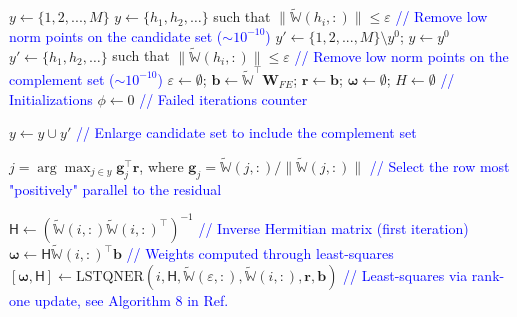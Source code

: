 \documentclass[11pt]{article}
\renewcommand{\vec}[1]{\mathbf{#1}}
\newcommand{\mat}[1]{\mathsf{#1}}
\begin{document}
            \begin{algorithm}[H]
                \begin{algorithmic} [1]%
                        \STATE $y\leftarrow \{1, 2, ..., M\}$
                        \STATE $y\leftarrow \{h_1, h_2, \dots\}$ such that $\| \widetilde{\mathbb{W}}(h_i, :) \| \leq \varepsilon$ \textcolor{blue}{// Remove low norm points on the candidate set ($\sim 10^{-10}$)}
                    \ELSE
                        \STATE $y' \leftarrow \{1, 2, ..., M\} \setminus y^0$; \quad $y\leftarrow y^0$
                        \STATE $y' \leftarrow \{h_1, h_2, \dots\}$ such that $\| \widetilde{\mathbb{W}}(h_i, :) \| \leq \varepsilon$ \textcolor{blue}{// Remove low norm points on the complement set ($\sim 10^{-10}$)}
                    \ENDIF
                    \STATE $\varepsilon \leftarrow \emptyset$; $\vec{b} \leftarrow \widetilde{\mathbb{W}}^\top \vec{W}_{FE}$; $\vec{r} \leftarrow \vec{b}$; $\boldsymbol\omega \leftarrow \emptyset$; $H \leftarrow \emptyset$ \textcolor{blue}{// Initializations}
                    \STATE $\phi \leftarrow 0$ \textcolor{blue}{// Failed iterations counter}

                        \IF{$\phi > \lambda$}
                            \STATE $y\leftarrow y \cup y'$ \textcolor{blue}{// Enlarge candidate set to include the complement set}
                        \ENDIF

                        \STATE $j = \arg\max_{j \in y} \vec{g}_j^\top \vec{r}$, where $\vec{g}_j = \widetilde{\mathbb{W}}(j, :) / \| \widetilde{\mathbb{W}}(j, :) \|$ \textcolor{blue}{// Select the row most "positively" parallel to the residual}

                            \STATE $\mat{H}\leftarrow (\widetilde{\mathbb{W}}(i, :) \widetilde{\mathbb{W}}(i, :)^\top)^{-1}$ \textcolor{blue}{// Inverse Hermitian matrix (first iteration)}
                            \STATE $\boldsymbol\omega \leftarrow \mat{H}\widetilde{\mathbb{W}}(i, :)^\top \vec{b}$ \textcolor{blue}{// Weights computed through least-squares}
                        \ELSE
                            \STATE $[\boldsymbol\omega, \mat{H}] \leftarrow \text{LSTQNER}(i, \mat{H}, \widetilde{\mathbb{W}}(\varepsilon, :), \widetilde{\mathbb{W}}(i, :), \vec{r}, \vec{b})$ \textcolor{blue}{// Least-squares via rank-one update, see Algorithm 8 in Ref.~\cite{bravo2024subspace}}
                        \ENDIF


\end{algorithmic}
\end{algorithm}
\end{document}
